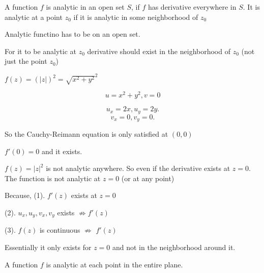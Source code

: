 \begin{definition}
   A function $f$ is analytic in an open set $S$, if $f$ has derivative everywhere in $S$. It is analytic at a point $z_0$ if it is analytic in some neighborhood of $z_0$
\end{definition}
\begin{remark}
   Analytic functino has to be on an open set.
\end{remark}
\begin{remark}
   For it to be analytic at $z_0$ derivative should exist in the neighborhood of $z_0$ (not just the point $z_0$)
\end{remark}


\begin{eg}
   $f(z) = (|z|)^2 = \sqrt{x^2+y^2}^2 $

   $$u = x^2 + y^2,v = 0$$

   \[
   u_x = 2x, u_y = 2y
   .\] 
   \[
   v_x = 0, v_y = 0
   .\] 

   So the Cauchy-Reimann equation is only satisfied at $(0,0)$

   $f'(0) = 0$ and it exists.
\end{eg}


\begin{remark}
   $f(z)= |z|^2$ is not analytic anywhere. So even if the derivative exists at $z = 0$. The function is not analytic at $z = 0$ (or at any point)

   Because, 
   (1).  $f'(z)$ exists at $z = 0$ 

   (2). $u_x,u_y,v_x,v_y$ exists  $\not \Rightarrow f'(z)$ 

   (3). $f(z)$ is continuous $\not \Rightarrow$  $f'(z)$ 

   Essentially it only exists for $z = 0$ and not in the neighborhood around it.
\end{remark}


\begin{definition}
   A function $f$ is analytic at each point in the entire plane. 
\end{definition}

